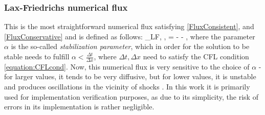 \subsubsection{Lax-Friedrichs numerical flux}
This is the most straightforward numerical flux satisfying \cref{FluxConsistent}, and \cref{FluxConservative} and is defined as follows:
\be
\mrH_{LF}\lo \mrv, \mrw, \bfn\ro = \left[\mrF\lo\mrv\ro + \mrF\lo\mrw\ro\right] - \lo \mrw - \mrv\ro,
\ee
where the parameter $\alpha$ is the so-called \textit{stabilization parameter}, which in order for the solution to be stable needs to fulfill $\alpha < \frac{\Delta t}{\Delta x}$, where $\Delta t, \Delta x$ need to satisfy the CFL condition \cref{equation:CFLcond}. Now, this numerical flux is very sensitive to the choice of $\alpha$ - for larger values, it tends to be very diffusive, but for lower values, it is unstable and produces oscillations in the vicinity of shocks \cite{lfunstable}. In this work it is primarily used for implementation verification purposes, as due to its simplicity, the risk of errors in its implementation is rather negligible.


